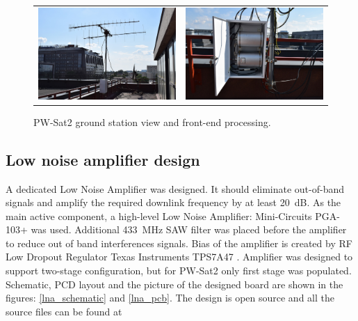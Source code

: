 \begin{figure}
   \centering
\begin{tabular}{cc}
        \includegraphics[width=0.3\paperwidth]{img/3/elka_view.jpg}
    & 
        \includegraphics[width=0.3\paperwidth]{img/3/elka_skrzynka.jpg}
\end{tabular}
\label{elka_skrzynka}
\caption{PW-Sat2 ground station view and front-end processing.}
\end{figure}


\subsection{Low noise amplifier design}
A dedicated Low Noise Amplifier was designed. It should eliminate out-of-band signals and amplify the required downlink frequency by at least \SI{20}{\dB}. As the main active component, a high-level Low Noise Amplifier: Mini-Circuits PGA-103+ \cite{lna_pga_datasheet} was used. Additional \SI{433}{\MHz} SAW filter was placed before the amplifier to reduce out of band interferences signals. Bias of the amplifier is created by RF Low Dropout Regulator Texas Instruments TPS7A47 \cite{lna_ldo_datasheet}. Amplifier was designed to support two-stage configuration, but for PW-Sat2 only first stage was populated. Schematic, PCD layout and the picture of the designed board are shown in the figures: \ref{lna_schematic} and \ref{lna_pcb}. The design is open source and all the source files can be found at \cite{lna_github}

